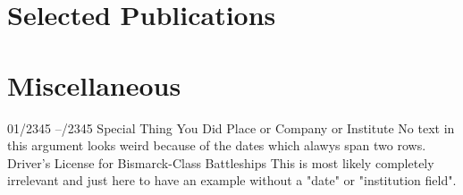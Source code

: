 \documentclass[letterpaper,11pt]{dolce-cv} %
\begin{document}
	\section{Selected Publications}

	\section{Miscellaneous}
	\begin{entrylist}
		\entry
		{01/2345 --/2345}
		{Special Thing You Did}
		{Place or Company or Institute}
		{No text in this argument looks weird because of the dates which alawys span two rows.}
		\entry
		{}
		{Driver’s License for Bismarck-Class Battleships}
		{}
		{This is most likely completely irrelevant and just here to have an example without a "date" or "institution field".}
	\end{entrylist}

\end{document}
